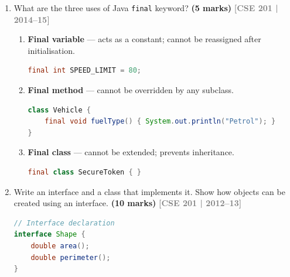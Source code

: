 \documentclass[12pt,a3paper]{article}
\newcommand{\yr}[1]{\hfill\textcolor{gray}{\small\textbf{[#1]}}}
\newcommand{\mk}[1]{\textcolor{orange!70!black}{\small\textbf{(#1 marks)}}}
\begin{document}
\begin{enumerate}
\begin{tcolorbox}[enhanced,breakable,ansbox,
  colback=cD!4,colframe=cD,boxrule=0.8pt,arc=5pt,
  title={\textbf{Answer --- Static Code Block}},
  fonttitle=\bfseries\color{white},colbacktitle=cD]
\end{tcolorbox}

\item What are the three uses of Java \texttt{final} keyword? \mk{5}
\yr{CSE 201 | 2014--15}

\begin{tcolorbox}[enhanced,breakable,ansbox,
  colback=cD!4,colframe=cD,boxrule=0.8pt,arc=5pt,
  title={\textbf{Answer --- Three Uses of the \texttt{final} Keyword}},
  fonttitle=\bfseries\color{white},colbacktitle=cD]

\begin{enumerate}[label=\textbf{\arabic*.}]
  \item \textbf{Final variable} --- acts as a constant; cannot be
    reassigned after initialisation.
    \begin{lstlisting}[language=Java]
final int SPEED_LIMIT = 80;
    \end{lstlisting}

  \item \textbf{Final method} --- cannot be overridden by any subclass.
    \begin{lstlisting}[language=Java]
class Vehicle {
    final void fuelType() { System.out.println("Petrol"); }
}
    \end{lstlisting}

  \item \textbf{Final class} --- cannot be extended; prevents inheritance.
    \begin{lstlisting}[language=Java]
final class SecureToken { }
    \end{lstlisting}
\end{enumerate}

\end{tcolorbox}



\item Write an interface and a class that implements it. Show how objects can be created using an interface. \mk{10}
\yr{CSE 201 | 2012--13}

\begin{tcolorbox}[enhanced,breakable,ansbox,
  colback=cD!4,colframe=cD,boxrule=0.8pt,arc=5pt,
  title={\textbf{Answer --- Interface, Implementing Class \& Object Creation}},
  fonttitle=\bfseries\color{white},colbacktitle=cD]

\begin{lstlisting}[language=Java]
// Interface declaration
interface Shape {
    double area();
    double perimeter();
}


\end{lstlisting}
\end{tcolorbox}
\end{enumerate}
\end{document}
